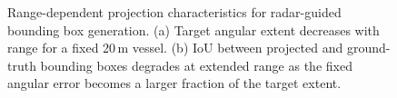 \begin{figure}[t]
\centering

\caption{Range-dependent projection characteristics for radar-guided bounding box generation. (a) Target angular extent decreases with range for a fixed 20\,m vessel. (b) IoU between projected and ground-truth bounding boxes degrades at extended range as the fixed angular error becomes a larger fraction of the target extent.}
\label{fig:range_error}
\end{figure}

